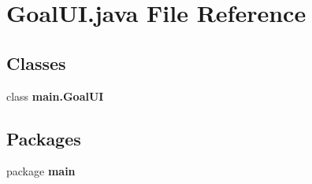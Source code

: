 \section{Goal\+U\+I.\+java File Reference}
\label{_goal_u_i_8java}
\subsection*{Classes}
\begin{DoxyCompactItemize}
\item 
class \textbf{ main.\+Goal\+UI}
\end{DoxyCompactItemize}
\subsection*{Packages}
\begin{DoxyCompactItemize}
\item 
package \textbf{ main}
\end{DoxyCompactItemize}
